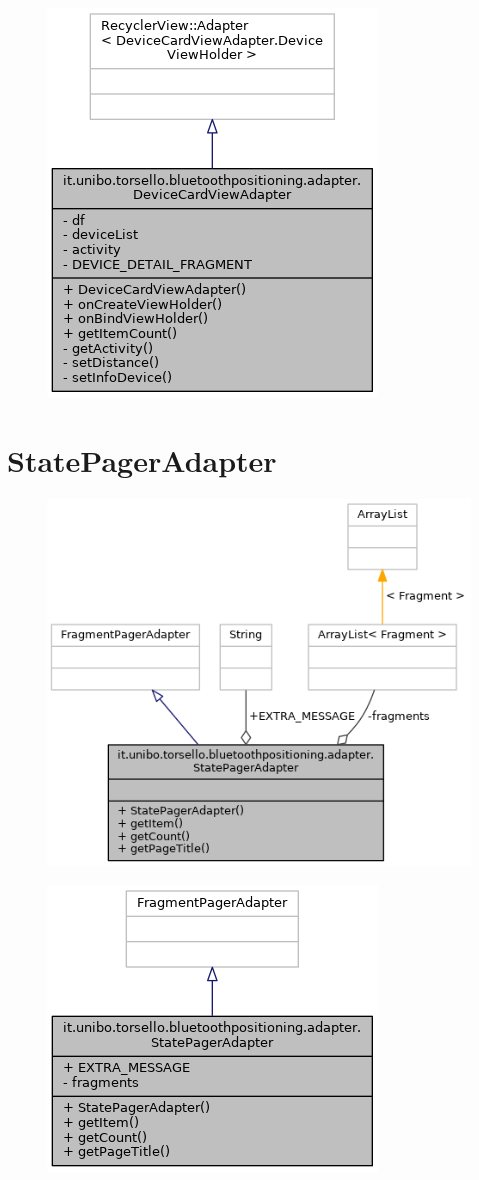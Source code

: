 \begin{figure}[ph]
	\centering
	\includegraphics[width=0.5\linewidth]{img/uml/class/classit_1_1unibo_1_1torsello_1_1bluetoothpositioning_1_1adapter_1_1DeviceCardViewAdapter__inherit__graph.png}
	\caption{}
\end{figure}

\newpage
\section{StatePagerAdapter}
\begin{figure}[ph]
	\centering
	\includegraphics[width=0.8\linewidth]{img/uml/class/classit_1_1unibo_1_1torsello_1_1bluetoothpositioning_1_1adapter_1_1StatePagerAdapter__coll__graph.png}
	\caption{}
\end{figure}

\begin{figure}[ph]
	\centering
	\includegraphics[width=0.5\linewidth]{img/uml/class/classit_1_1unibo_1_1torsello_1_1bluetoothpositioning_1_1adapter_1_1StatePagerAdapter__inherit__graph.png}
	\caption{}
\end{figure}

